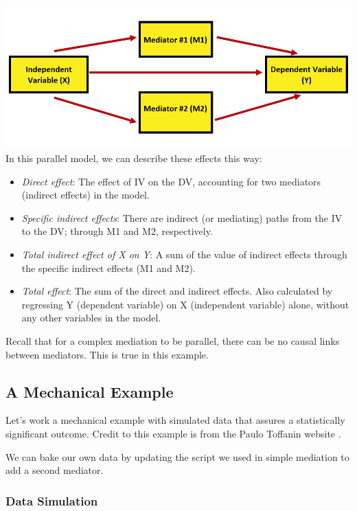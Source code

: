 \documentclass[
  11pt,
]{book}
\providecommand{\tightlist}{%
  \setlength{\itemsep}{0pt}\setlength{\parskip}{0pt}}
\begin{document}
\includegraphics{images/CompMed/ParaMed.jpg} In this parallel model, we can describe these effects this way:

\begin{itemize}
\tightlist
\item
  \emph{Direct effect}: The effect of IV on the DV, accounting for two mediators (indirect effects) in the model.
\item
  \emph{Specific indirect effects}: There are indirect (or mediating) paths from the IV to the DV; through M1 and M2, respectively.
\item
  \emph{Total indirect effect of X on Y}: A sum of the value of indirect effects through the specific indirect effects (M1 and M2).
\item
  \emph{Total effect}: The sum of the direct and indirect effects. Also calculated by regressing Y (dependent variable) on X (independent variable) alone, without any other variables in the model.
\end{itemize}

Recall that for a complex mediation to be parallel, there can be no causal links between mediators. This is true in this example.

\hypertarget{a-mechanical-example}{%
\subsection{A Mechanical Example}\label{a-mechanical-example}}

Let's work a mechanical example with simulated data that assures a statistically significant outcome. Credit to this example is from the Paulo Toffanin website \citep{toffanin_multiple-mediator_2017}.

We can bake our own data by updating the script we used in simple mediation to add a second mediator.

\hypertarget{data-simulation-1}{%
\subsubsection{Data Simulation}\label{data-simulation-1}}
\end{document}
